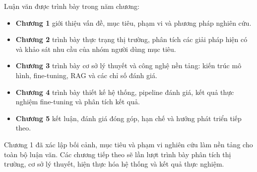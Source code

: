 Luận văn được trình bày trong năm chương:

\begin{itemize}
\item
  \textbf{Chương 1} giới thiệu vấn đề, mục tiêu, phạm vi và phương pháp
  nghiên cứu.
\item
  \textbf{Chương 2} trình bày thực trạng thị trường, phân tích các giải
  pháp hiện có và khảo sát nhu cầu của nhóm người dùng mục tiêu.
\item
  \textbf{Chương 3} trình bày cơ sở lý thuyết và công nghệ nền tảng: kiến
  trúc mô hình, fine-tuning, RAG và các chỉ số đánh giá.
\item
  \textbf{Chương 4} trình bày thiết kế hệ thống, pipeline đánh giá, kết
  quả thực nghiệm fine-tuning và phân tích kết quả.
\item
  \textbf{Chương 5} kết luận, đánh giá đóng góp, hạn chế và hướng phát
  triển tiếp theo.
\end{itemize}

Chương 1 đã xác lập bối cảnh, mục tiêu và phạm vi nghiên cứu làm nền
tảng cho toàn bộ luận văn. Các chương tiếp theo sẽ lần lượt trình bày
phân tích thị trường, cơ sở lý thuyết, hiện thực hóa hệ thống và kết
quả thực nghiệm.
